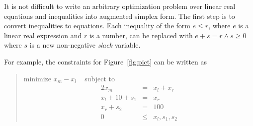 \documentclass{article}
\begin{document}
It is not difficult to write an arbitrary optimization problem over linear
real equations and inequalities into augmented simplex form.  The first
step is to convert inequalities to equations.  Each inequality of the form
$e \leq r$, where $e$ is a linear real expression and $r$ is a number, can be
replaced with $e + s = r \wedge s \geq 0$ where $s$ is a new non-negative
\emph{slack} variable.

For example, the constraints for Figure~\ref{fig:pict} can be written as
\begin{quote}\vspace*{-1ex}
minimize $x_m - x_l$ 
~ subject to 
$$
\begin{array}{rcl}
2 x_m & = & x_l + x_r \\
x_l + 10 + s_1& = &x_r \\
x_r + s_2 &= &100 \\
0 &\leq & x_l, s_1, s_2
\end{array}$$
\end{quote}\vspace{-0.9ex}
\end{document}
